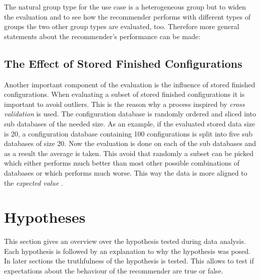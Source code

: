 The natural group type for the use case is a heterogeneous group but to widen the evaluation and to see how the recommender performs with different types of groups the two other group types are evaluated, too. Therefore more general statements about the recommender's performance can be made:

\subsection{The Effect of Stored Finished Configurations}

Another important component of the evaluation is the influence of stored finished configurations. When evaluating a subset of stored finished configurations it is important to avoid outliers. This is the reason why a process inspired by \emph{cross validation}  is used. The configuration database is randomly ordered and sliced into sub databases of the needed size. As an example, if the evaluated stored data size is 20, a configuration database containing 100 configurations is split into five sub databases of size 20. Now the evaluation is done on each of the sub databases and as a result the average is taken. This avoid that randomly a subset can be picked which either performs much better than most other possible combinations of databases or which performs much worse. This way the data is more aligned to the \emph{expected value} .


\section{Hypotheses}
\label{sec:Evaluation:Hypotheses}

This section gives an overview over the hypothesis tested during data analysis. Each hypothesis is followed by an explanation to why the hypothesis was posed. In later sections the truthfulness of the hypothesis is tested. This allows to test if expectations about the behaviour of the recommender are true or false.

